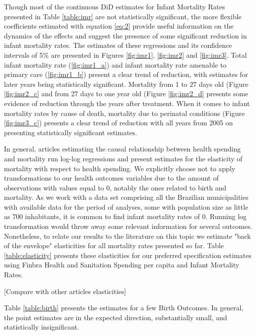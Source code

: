 Though most of the continuous DiD estimates for Infant Mortality Rates presented in Table \ref{table:imr} are not statistically significant, the more flexible coefficients estimated with equation \ref{eq:2} provide useful information on the dynamics of the effects and suggest the presence of some significant reduction in infant mortality rates. The estimates of these regressions and its confidence intervals of 5\% are presented in Figures \ref{fig:imr1}, \ref{fig:imr2} and \ref{fig:imr3}. Total infant mortality rate (\ref{fig:imr1_a}) and infant mortality rate amenable to primary care (\ref{fig:imr1_b}) present a clear trend of reduction, with estimates for later years being statistically significant. Mortality from 1 to 27 days old (Figure \ref{fig:imr2_c} and from 27 days to one year old (Figure \ref{fig:imr2_d} presents some evidence of reduction through the years after treatment. When it comes to infant mortality rates by cause of death, mortality due to perinatal conditions (Figure \ref{fig:imr3_c}) presents a clear trend of reduction with all years from 2005 on presenting statistically significant estimates.

In general, articles estimating the causal relationship between health spending and mortality run log-log regressions and present estimates for the elasticity of mortality with respect to health spending. We explicitly choose not to apply transformations to our health outcomes variables due to the amount of observations with values equal to 0, notably the ones related to birth and mortality. As we work with a data set comprising all the Brazilian municipalities with available data for the period of analyses, some with population size as little as 700 inhabitants, it is common to find infant mortality rates of 0. Running log transformation would throw away some relevant information for several outcomes. Nonetheless, to relate our results to the literature on this topic we estimate "back of the envelope" elasticities for all mortality rates presented so far. Table \ref{table:elasticity} presents these elasticities for our preferred specification estimates using Finbra Health and Sanitation Spending per capita and Infant Mortality Rates. 










[Compare with other articles elasticities]




Table \ref{table:birth} presents the estimates for a few Birth Outcomes. In general, the point estimates are in the expected direction, substantially small, and statistically insignificant.      





